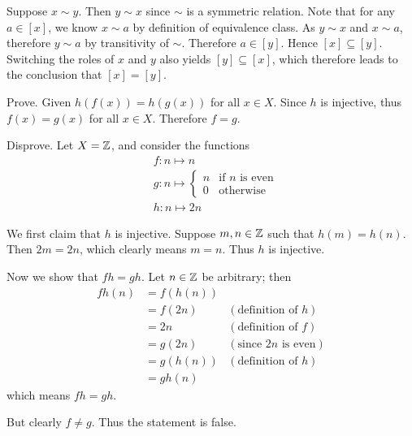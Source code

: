 \begin{questions}
\begin{partquestions}{\alph*}
        \item Suppose $x \mathrel{\sim} y$. Then $y \mathrel{\sim} x$ since $\sim$ is a symmetric relation. Note that for any $a \in [x]$, we know $x \mathrel{\sim} a$ by definition of equivalence class. As $y \mathrel{\sim} x$ and $x \mathrel{\sim} a$, therefore $y \mathrel{\sim} a$ by transitivity of $\sim$. Therefore $a \in [y]$. Hence $[x] \subseteq [y]$. Switching the roles of $x$ and $y$ also yields $[y] \subseteq [x]$, which therefore leads to the conclusion that $[x] = [y]$.
    \end{partquestions}

    \item \begin{partquestions}{\alph*}
        \item Prove. Given $h(f(x)) = h(g(x))$ for all $x \in X$. Since $h$ is injective, thus $f(x) = g(x)$ for all $x \in X$. Therefore $f = g$.

        \item Disprove. Let $X = \mathbb{Z}$, and consider the functions
        \begin{align*}
            &f: n \mapsto n\\
            &g: n \mapsto \begin{cases}
                n & \text{if } n \text{ is even}\\
                0 & \text{otherwise}
            \end{cases}\\
            &h: n \mapsto 2n
        \end{align*}

        We first claim that $h$ is injective. Suppose $m,n\in\mathbb{Z}$ such that $h(m) = h(n)$. Then $2m = 2n$, which clearly means $m = n$. Thus $h$ is injective.

        Now we show that $fh = gh$. Let $n \in \mathbb{Z}$ be arbitrary; then
        \begin{align*}
            fh(n) &= f(h(n))\\
            &= f(2n) & (\text{definition of } h)\\
            &= 2n & (\text{definition of } f)\\
            &= g(2n) & (\text{since } 2n \text{ is even})\\
            &= g(h(n)) & (\text{definition of } h)\\
            &= gh(n)
        \end{align*}
        which means $fh = gh$.

        But clearly $f \neq g$. Thus the statement is false.
    \end{partquestions}


\end{questions}
